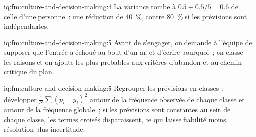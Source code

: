 \begin{solution}{iq:fm:culture-and-decision-making:4}
La variance tombe à $0.5+0.5/5=0.6$ de celle d'une personne~: une réduction de 40~\%, contre 80~\% si les prévisions sont indépendantes.
\end{solution}

\begin{solution}{iq:fm:culture-and-decision-making:5}
Avant de s'engager, on demande à l'équipe de supposer que l'entrée a échoué au bout d'un an et d'écrire pourquoi~; on classe les raisons et on ajoute les plus probables aux
critères d'abandon et au chemin critique du plan.
\end{solution}

\begin{solution}{iq:fm:culture-and-decision-making:6}
Regrouper les prévisions en classes~; développer $\frac1N\sum(p_i-y_i)^2$ autour de la fréquence observée de chaque classe et autour de la fréquence globale~; si les prévisions
sont constantes au sein de chaque classe, les termes croisés disparaissent, ce qui laisse fiabilité moins résolution plus incertitude.
\end{solution}
